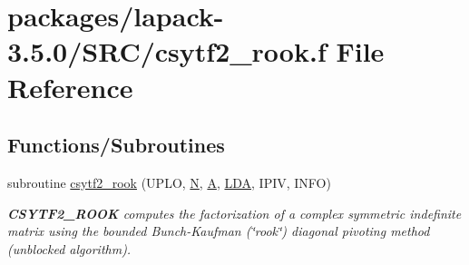 \hypertarget{csytf2__rook_8f}{}\section{packages/lapack-\/3.5.0/\+S\+R\+C/csytf2\+\_\+rook.f File Reference}
\label{csytf2__rook_8f}
\subsection*{Functions/\+Subroutines}
\begin{DoxyCompactItemize}
\item 
subroutine \hyperlink{group__complexSYcomputational_ga9baea00306a19fc23c46b5052f4168f7}{csytf2\+\_\+rook} (U\+P\+L\+O, \hyperlink{polmisc_8c_a0240ac851181b84ac374872dc5434ee4}{N}, \hyperlink{classA}{A}, \hyperlink{example__user_8c_ae946da542ce0db94dced19b2ecefd1aa}{L\+D\+A}, I\+P\+I\+V, I\+N\+F\+O)
\begin{DoxyCompactList}\small\item\em {\bfseries C\+S\+Y\+T\+F2\+\_\+\+R\+O\+O\+K} computes the factorization of a complex symmetric indefinite matrix using the bounded Bunch-\/\+Kaufman (\char`\"{}rook\char`\"{}) diagonal pivoting method (unblocked algorithm). \end{DoxyCompactList}\end{DoxyCompactItemize}
